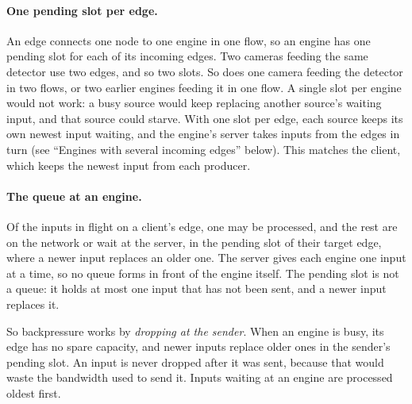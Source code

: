 \documentclass[11pt]{article}
\begin{document}
\paragraph{One pending slot per edge.} An edge connects one node to one engine
in one flow, so an engine has one pending slot for each of its incoming edges.
Two cameras feeding the same detector use two edges, and so two slots. So
does one camera feeding the detector in two flows, or two earlier engines
feeding it in one flow. A single slot per engine would not work: a busy source
would keep replacing another source's waiting input, and that source could
starve. With one slot per edge, each source keeps its own newest input
waiting, and the engine's server takes inputs from the edges in turn (see
``Engines with several incoming edges'' below). This matches the
client, which keeps the newest input from each producer.

\paragraph{The queue at an engine.} Of the inputs in flight on a client's
edge, one may be processed, and the rest are on the network or wait at the
server, in the pending slot of their target edge, where a newer input
replaces an older one. The server gives each engine one input at a time, so
no queue forms in front of the engine itself. The pending slot is not a
queue: it holds at most one input that has not been sent, and a newer input
replaces it.

So backpressure works by \emph{dropping at the sender}. When an engine is
busy, its edge has no spare capacity, and newer inputs replace older ones in
the sender's pending slot. An input is never dropped after it was sent,
because that would waste the bandwidth used to send it. Inputs waiting at an
engine are processed oldest first.
\end{document}
